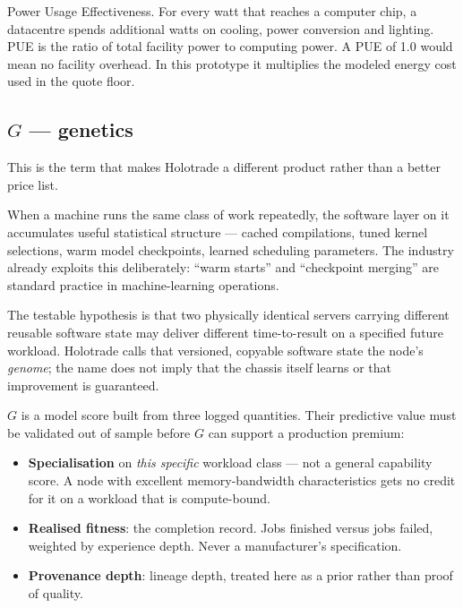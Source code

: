 \documentclass[11pt,letterpaper]{article}
\begin{document}
\begin{plainbox}
Power Usage Effectiveness. For every watt that reaches a computer chip, a
datacentre spends additional watts on cooling, power conversion and lighting.
PUE is the ratio of total facility power to computing power. A PUE of 1.0 would
mean no facility overhead. In this prototype it multiplies the modeled energy
cost used in the quote floor.
\end{plainbox}

\subsection{$G$ --- genetics}

This is the term that makes Holotrade a different product rather than a better
price list.

\begin{plainbox}[]
When a machine runs the same class of work repeatedly, the software layer on it
accumulates useful statistical structure --- cached compilations, tuned kernel
selections, warm model checkpoints, learned scheduling parameters. The industry
already exploits this deliberately: ``warm starts'' and ``checkpoint merging''
are standard practice in machine-learning operations.

\vspace{4pt}
The testable hypothesis is that two physically identical servers carrying
different reusable software state may deliver different time-to-result on a
specified future workload. Holotrade calls that versioned, copyable software
state the node's \emph{genome}; the name does not imply that the chassis itself
learns or that improvement is guaranteed.
\end{plainbox}

$G$ is a model score built from three logged quantities. Their predictive value
must be validated out of sample before $G$ can support a production premium:

\begin{itemize}[leftmargin=1.4em,itemsep=3pt]
\item \textbf{Specialisation} on \emph{this specific} workload class --- not a
general capability score. A node with excellent memory-bandwidth
characteristics gets no credit for it on a workload that is compute-bound.
\item \textbf{Realised fitness}: the completion record. Jobs finished versus
jobs failed, weighted by experience depth. Never a manufacturer's specification.
\item \textbf{Provenance depth}: lineage depth, treated here as a prior rather
than proof of quality.
\end{itemize}
\end{document}
